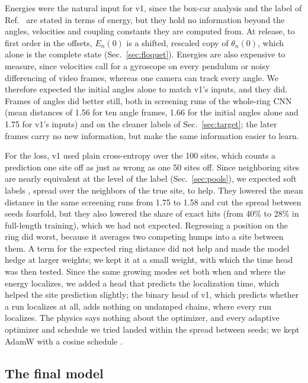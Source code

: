 \documentclass[11pt]{article}
\begin{document}
Energies were the natural input for v1, since the box-car analysis and the label of Ref.~\cite{mittal2026jand} are stated in terms of energy, but they hold no information beyond the angles, velocities and coupling constants they are computed from. At release, to first order in the offsets, $E_n(0)$ is a shifted, rescaled copy of $\theta_n(0)$, which alone is the complete state (Sec.~\ref{sec:floquet}). Energies are also expensive to measure, since velocities call for a gyroscope on every pendulum or noisy differencing of video frames, whereas one camera can track every angle. We therefore expected the initial angles alone to match v1's inputs, and they did. Frames of angles did better still, both in screening runs of the whole-ring CNN (mean distances of 1.56 for ten angle frames, 1.66 for the initial angles alone and 1.75 for v1's inputs) and on the cleaner labels of Sec.~\ref{sec:target}; the later frames carry no new information, but make the same information easier to learn.

For the loss, v1 used plain cross-entropy over the 100 sites, which counts a prediction one site off as just as wrong as one 50 sites off. Since neighboring sites are nearly equivalent at the level of the label (Sec.~\ref{sec:pools}), we expected soft labels \cite{szegedy2016rethinking}, spread over the neighbors of the true site, to help. They lowered the mean distance in the same screening runs from 1.75 to 1.58 and cut the spread between seeds fourfold, but they also lowered the share of exact hits (from 40\% to 28\% in full-length training), which we had not expected. Regressing a position on the ring did worst, because it averages two competing humps into a site between them. A term for the expected ring distance did not help and made the model hedge at larger weights; we kept it at a small weight, with which the time head was then tested. Since the same growing modes set both when and where the energy localizes, we added a head that predicts the localization time, which helped the site prediction slightly; the binary head of v1, which predicts whether a run localizes at all, adds nothing on undamped chains, where every run localizes. The physics says nothing about the optimizer, and every adaptive optimizer and schedule we tried landed within the spread between seeds; we kept AdamW \cite{loshchilov2019decoupled} with a cosine schedule \cite{loshchilov2017sgdr}.

\subsection{The final model}
\label{sec:final}
\end{document}
